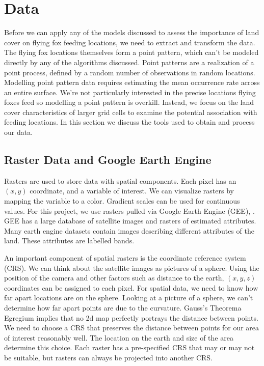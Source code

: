 \documentclass[
  12pt,
  letterpaper,
  DIV=11,
  numbers=noendperiod]{scrartcl}
\begin{document}
\section{Data}\label{sec:Data}

Before we can apply any of the models discussed to assess the importance
of land cover on flying fox feeding locations, we need to extract and
transform the data. The flying fox locations themselves form a point
pattern, which can't be modeled directly by any of the algorithms
discussed. Point patterns are a realization of a point process, defined
by a random number of observations in random locations. Modelling point
pattern data requires estimating the mean occurrence rate across an
entire surface. We're not particularly interested in the precise
locations flying foxes feed so modelling a point pattern is overkill.
Instead, we focus on the land cover characteristics of larger grid cells
to examine the potential association with feeding locations. In this
section we discuss the tools used to obtain and process our data.

\subsection{Raster Data and Google Earth
Engine}\label{raster-data-and-google-earth-engine}

Rasters are used to store data with spatial components. Each pixel has
an \((x,y)\) coordinate, and a variable of interest. We can visualize
rasters by mapping the variable to a color. Gradient scales can be used
for continuous values. For this project, we use rasters pulled via
Google Earth Engine (GEE), \cite{gee}. GEE has a large database of
satellite images and rasters of estimated attributes. Many earth engine
datasets contain images describing different attributes of the land.
These attributes are labelled bands.

An important component of spatial rasters is the coordinate reference
system (CRS). We can think about the satellite images as pictures of a
sphere. Using the position of the camera and other factors such as
distance to the earth, \((x,y,z)\) coordinates can be assigned to each
pixel. For spatial data, we need to know how far apart locations are on
the sphere. Looking at a picture of a sphere, we can't determine how far
apart points are due to the curvature. Gauss's Theorema Egregium implies
that no 2d map perfectly portrays the distance between points. We need
to choose a CRS that preserves the distance between points for our area
of interest reasonably well. The location on the earth and size of the
area determine this choice. Each raster has a pre-specified CRS that may
or may not be suitable, but rasters can always be projected into another
CRS.
\end{document}
